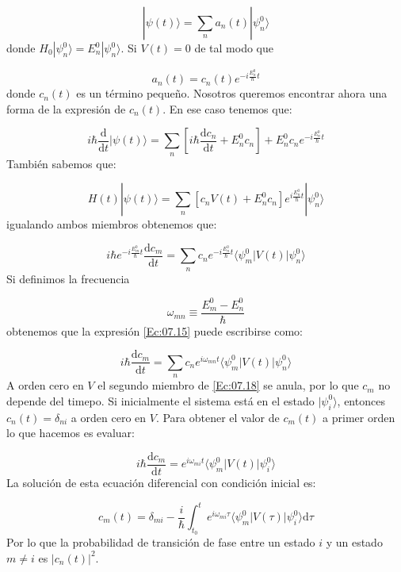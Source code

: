 \documentclass[12pt,a4paper]{book}
\numberwithin{equation}{chapter}
\numberwithin{figure}{chapter}
\newcommand{\ccorchetes}[1]{\left[ #1  \right]}
\newcommand{\D}{\mathrm{d}}
\newcommand{\derivadas}[2]{\frac{\D #1}{\D #2}}
\begin{document}
\begin{equation}
|\psi(t)\rangle = \sum_n a_n (t) |\psi_n^0\rangle
\end{equation}
donde $H_0 |\psi_n^0\rangle = E_n^0 |\psi_n^0\rangle$. Si $V(t)=0$ de tal modo que 

\begin{equation}
a_n(t) = c_n(t) e^{- i \frac{E_n^0}{\hbar}t}
\end{equation}
donde $c_n(t)$ es un término pequeño. Nosotros queremos encontrar ahora una forma de la expresión de $c_n(t)$. En ese caso tenemos que:

\begin{equation}
i \hbar \derivadas{}{t}|\psi(t)\rangle = \sum_n \ccorchetes{i\hbar \derivadas{c_n}{t}+E_n^0 c_n}+E_n^0 c_n e^{-i\frac{E_n^0}{\hbar}t}
\end{equation}
También sabemos que:

\begin{equation}
H(t) |\psi (t) \rangle = \sum_n \ccorchetes{c_n V(t) + E_n^0 c_n}e^{i \frac{E_n^0}{\hbar} t} |\psi_n^0 \rangle
\end{equation}
igualando ambos miembros obtenemos que:

\begin{equation}
i \hbar e^{-i\frac{E^0_m}{\hbar}t} \derivadas{c_m}{t} = \sum_n c_n e^{- i \frac{E_n^0}{\hbar} t} \langle \psi_m^0 | V(t) | \psi_n^0\rangle
\label{Ec:07.15}
\end{equation}
Si definimos la frecuencia 

\begin{equation}
\omega_{mn} \equiv \frac{E_m^0 - E_n^0}{\hbar}
\end{equation}
obtenemos  que la expresión \ref{Ec:07.15} puede escribirse como:

\begin{equation}
i \hbar \derivadas{c_m}{t} = \sum_n c_n e^{i \omega_{mn} t} \langle \psi_m^0 | V(t) | \psi_n^0 \rangle  \label{Ec:07.18}
\end{equation}
A orden cero en $V$ el segundo miembro de \ref{Ec:07.18} se anula, por lo que $c_m$ no depende del timepo. Si inicialmente el sistema está en el estado $|\psi_i^0\rangle$, entonces $c_n(t)=\delta_{ni}$ a orden cero en $V$. Para obtener el valor de $c_m(t)$ a primer orden lo que hacemos es evaluar:

\begin{equation}
i \hbar \derivadas{c_m}{t} = e^{i \omega_{mi} t} \langle \psi_m^0 | V (t) | \psi_i^0 \rangle
\end{equation}
La solución de esta ecuación diferencial con condición inicial es:

\begin{equation}
c_m(t) = \delta_{mi} - \frac{i}{\hbar} \int_{t_0}^t e^{i\omega_{mi} \tau} \langle \psi_m^0 | V(\tau) | \psi_i^0\rangle \D \tau 
\end{equation}
Por lo que la probabilidad de transición de fase entre un estado $i$ y un estado $m\neq i$ es $|c_n(t)|^2$.
\end{document}
